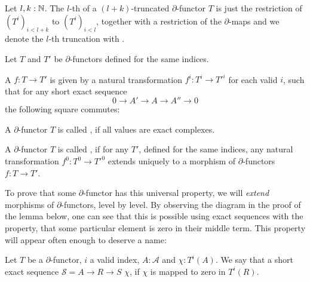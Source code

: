 \begin{definition}
  Let $l,k:\mathbb{N}$.
  The $l$-th  of a $(l+k)$-truncated $\partial$-functor $T$
  is just the restriction of $(T^i)_{i<l+k}$ to $(T^i)_{i<l}$, together with a restriction of the $\partial$-maps
  and we denote the $l$-th truncation with .
\end{definition}

\begin{definition}
  Let $T$ and $T'$ be $\partial$-functors defined for the same indices.
  
  A  $f:T\to T'$ is given by a natural transformation $f^i:T^i\to T'^i$ for each valid $i$,
  such that for any short exact sequence
  \[ 0\to A'\to A\to A''\to 0\]
  the following square commutes:
  \begin{center}
  \end{center}
\end{definition}

\begin{definition}
  A $\partial$-functor $T$ is called ,
  if all values are exact complexes.
\end{definition}

\begin{definition}
  A $\partial$-functor $T$ is called , if for any $T'$, defined for the same indices,
  any natural transformation $f^0:T^0\to T'^0$ extends uniquely to a morphism of $\partial$-functors $f:T\to T'$.
\end{definition}

To prove that some $\partial$-functor has this universal property,
we will \emph{extend} morphisms of $\partial$-functors, level by level.
By observing the diagram in the proof of the lemma below,
one can see that this is possible using exact sequences with the property,
that some particular element is zero in their middle term.
This property will appear often enough to deserve a name:

\begin{definition}
  Let $T$ be a $\partial$-functor, $i$ a valid index, $A:\mathcal A$ and $\chi:T^i(A)$.
  We say that a short exact sequence $\mathcal{S}=A\to R\to S$  $\chi$,
  if $\chi$ is mapped to zero in $T^i(R)$.
\end{definition}

